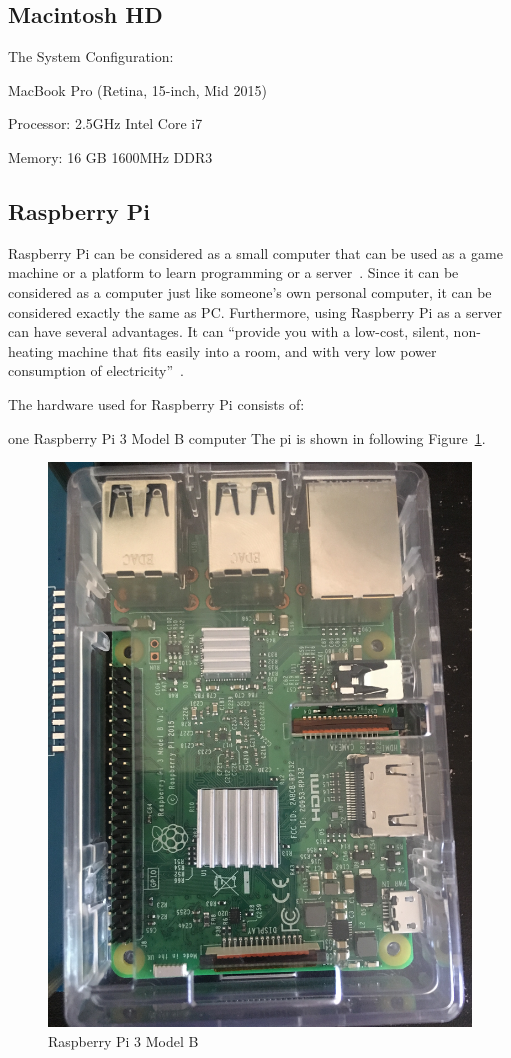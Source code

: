 \subsection{Macintosh HD}
The System Configuration:

MacBook Pro (Retina, 15-inch, Mid 2015)

Processor: 2.5GHz Intel Core i7

Memory: 16 GB 1600MHz DDR3


\subsection{Raspberry Pi}
Raspberry Pi can be considered as a small computer that can be used 
as a game machine or a platform to learn programming or a 
server~\cite{hid-sp18-508-raspberryPi}. Since it can be considered as a
computer just like someone's own personal computer, it can be considered 
exactly the same as PC. Furthermore, using Raspberry Pi as a server can
have  several advantages. It can ``provide you with a low-cost, silent, non-heating
 machine that fits easily into a room, and with very low power consumption of
 electricity''~\cite{hid-sp18-508-raspberryServer}.

The hardware used for Raspberry Pi consists of: 

one Raspberry Pi 3 Model B computer
The pi is shown in following Figure~\ref{f:fly}.

\begin{figure}[!ht]
  \centering\includegraphics[width=\columnwidth]{images/pi.jpeg}
  \caption{Raspberry Pi 3 Model B}\label{f:fly}
\end{figure}


